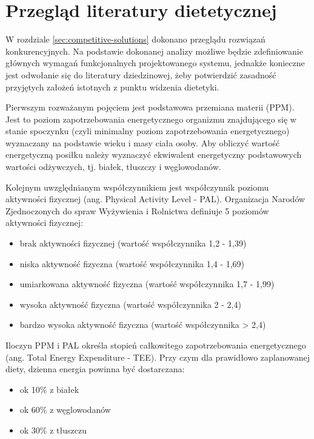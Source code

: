 \section{Przegląd literatury dietetycznej}\label{sec:domain-literature}

W rozdziale \ref{sec:competitive-solutions} dokonano przeglądu rozwiązań konkurencyjnych.
Na podstawie dokonanej analizy możliwe będzie zdefiniowanie głównych wymagań funkcjonalnych projektowanego systemu, jednakże konieczne jest odwołanie się do literatury dziedzinowej, żeby potwierdzić zasadność przyjętych założeń istotnych z punktu widzenia dietetyki.

\par
Pierwszym rozważanym pojęciem jest podstawowa przemiana materii (PPM).
Jest to poziom zapotrzebowania energetycznego organizmu znajdującego się w stanie spoczynku (czyli minimalny poziom zapotrzebowania energetycznego) wyznaczany na podstawie wieku i masy ciała osoby.
Aby obliczyć wartość energetyczną posiłku należy wyznaczyć ekwiwalent energetyczny podstawowych wartości odżywczych, tj. białek, tłuszczy i węglowodanów\cite{book:dietetyka-zywienie-zdroweg-i-chorego-czlowieka}.

\par
Kolejnym uwzględnianym współczynnikiem jest współczynnik poziomu aktywności fizycznej (ang. Physical Activity Level - PAL).
Organizacja Narodów Zjednoczonych do spraw Wyżywienia i Rolnictwa definiuje 5 poziomów aktywności fizycznej\cite{url:fao-pal}:
\begin{itemize}
    \item brak aktywności fizycznej (wartość współczynnika 1,2 - 1,39)
    \item niska aktywność fizyczna (wartość współczynnika 1,4 - 1,69)
    \item umiarkowana aktywność fizyczna (wartość współczynnika 1,7 - 1,99)
    \item wysoka aktywność fizyczna (wartość współczynnika 2 - 2,4)
    \item bardzo wysoka aktywność fizyczna (wartość współczynnika > 2,4)
\end{itemize}

\par
Iloczyn PPM i PAL określa stopień całkowitego zapotrzebowania energetycznego (ang. Total Energy Expenditure - TEE)\cite{book:normy-zywienia-czlowieka}.
Przy czym dla prawidłowo zaplanowanej diety, dzienna energia powinna być dostarczana:
\begin{itemize}
    \item ok 10\% z białek
    \item ok 60\% z węglowodanów
    \item ok 30\% z tłuszczu
\end{itemize}

